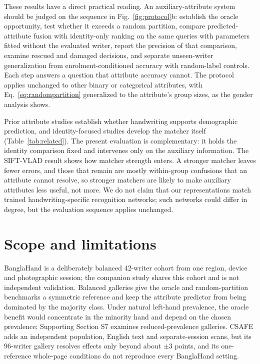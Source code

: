 These results have a direct practical reading. An auxiliary-attribute system should be judged on the sequence in Fig.~\ref{fig:protocol}b: establish the oracle opportunity, test whether it exceeds a random partition, compare predicted-attribute fusion with identity-only ranking on the same queries with parameters fitted without the evaluated writer, report the precision of that comparison, examine rescued and damaged decisions, and separate unseen-writer generalization from enrolment-conditioned accuracy with random-label controls. Each step answers a question that attribute accuracy cannot. The protocol applies unchanged to other binary or categorical attributes, with Eq.~\eqref{eq:randompartition} generalized to the attribute's group sizes, as the gender analysis shows.

Prior attribute studies establish whether handwriting supports demographic prediction, and identity-focused studies develop the matcher itself (Table~\ref{tab:related}). The present evaluation is complementary: it holds the identity comparison fixed and intervenes only on the auxiliary information. The SIFT-VLAD result shows how matcher strength enters. A stronger matcher leaves fewer errors, and those that remain are mostly within-group confusions that an attribute cannot resolve, so stronger matchers are likely to make auxiliary attributes less useful, not more. We do not claim that our representations match trained handwriting-specific recognition networks; such networks could differ in degree, but the evaluation sequence applies unchanged.

\section{Scope and limitations}
\label{sec:limitations}
BanglaHand is a deliberately balanced 42-writer cohort from one region, device and photographic session; the companion study shares this cohort and is not independent validation. Balanced galleries give the oracle and random-partition benchmarks a symmetric reference and keep the attribute predictor from being dominated by the majority class. Under natural left-hand prevalence, the oracle benefit would concentrate in the minority hand and depend on the chosen prevalence; Supporting Section S7 examines reduced-prevalence galleries. CSAFE adds an independent population, English text and separate-session scans, but its 96-writer gallery resolves effects only beyond about $\pm3$ points, and its one-reference whole-page conditions do not reproduce every BanglaHand setting.

